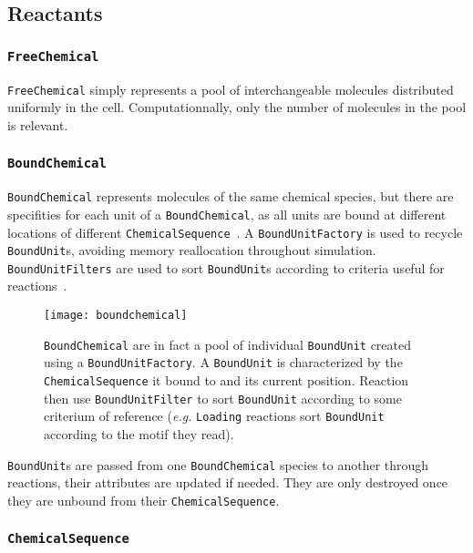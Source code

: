 
\subsection{Reactants}

\subsubsection{\texttt{FreeChemical}}

\texttt{FreeChemical} simply represents a pool of interchangeable molecules distributed uniformly in the cell. Computationnally, only the number of molecules in the pool is relevant.

\subsubsection{\texttt{BoundChemical}}

\texttt{BoundChemical} represents molecules of the same chemical species, but there are specifities for each unit of a \texttt{BoundChemical}, as all units are bound at different locations of different \texttt{ChemicalSequence}~. A \texttt{BoundUnitFactory} is used to recycle \texttt{BoundUnit}s, avoiding memory reallocation throughout simulation. \texttt{BoundUnitFilters} are used to sort \texttt{BoundUnit}s according to criteria useful for reactions~.

\begin{figure}[!h]
  \centering
  \texttt{[image: boundchemical]}
  \caption{\texttt{BoundChemical} are in fact a pool of individual \texttt{BoundUnit} created using a \texttt{BoundUnitFactory}. A \texttt{BoundUnit} is characterized by the \texttt{ChemicalSequence} it bound to and its current position. Reaction then use \texttt{BoundUnitFilter} to sort \texttt{BoundUnit} according to some criterium of reference (\textit{e.g.} \texttt{Loading} reactions sort \texttt{BoundUnit} according to the motif they read).}
  \label{fig:bound_chemical}
\end{figure}

\texttt{BoundUnit}s are passed from one \texttt{BoundChemical} species to another through reactions, their attributes are updated if needed. They are only destroyed once they are unbound from their \texttt{ChemicalSequence}.

\subsubsection{\texttt{ChemicalSequence}}

